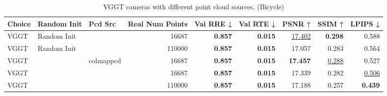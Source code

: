 \begin{table}[H]
\caption{VGGT cameras with different point cloud sources. (Bicycle)}
\label{tab:06_isolated_cams_vggt_bicycle}
\begin{tabular}{lllrrrrrr}
\toprule
Choice & Random Init & Pcd Src & Real Num Points & Val RRE ↓ & Val RTE ↓ & PSNR ↑ & SSIM ↑ & LPIPS ↓ \\
\midrule
VGGT & Random Init &  & 16687 & \textbf{0.857} & \textbf{0.015} & \underline{17.402} & \textbf{0.298} & 0.588 \\
VGGT & Random Init &  & 110000 & \textbf{0.857} & \textbf{0.015} & 17.057 & 0.283 & 0.564 \\
VGGT &  & colmappcd & 16687 & \textbf{0.857} & \textbf{0.015} & \textbf{17.457} & \underline{0.288} & 0.527 \\
VGGT &  &  & 16687 & \textbf{0.857} & \textbf{0.015} & 17.339 & 0.282 & \underline{0.506} \\
VGGT &  &  & 110000 & \textbf{0.857} & \textbf{0.015} & 17.188 & 0.257 & \textbf{0.439} \\
\bottomrule
\end{tabular}
\end{table}
